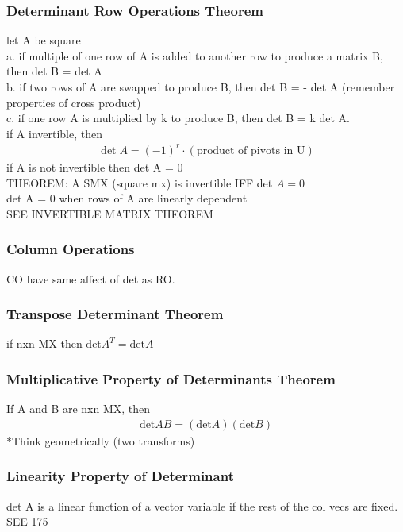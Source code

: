 \documentclass[12pt]{article}
\begin{document}
    \subsubsection{Determinant Row Operations Theorem}
        let A be square \\
        a. if multiple of one row of A is added to another row to
        produce a matrix B, then det B = det A \\
        b. if two rows of A are swapped to produce B, then
        det B = - det A (remember properties of cross product) \\
        c. if one row A is multiplied by k to produce B, then
        det B = k det A.\\
        if A invertible, then
        \begin{align*}
            \det A = (-1)^{r} \cdot (\text{product of pivots in U})
        \end{align*}
        if A is not invertible then det A = 0 \\
        THEOREM: A SMX (square mx) is invertible IFF det  $A= 0$  \\
        det A = 0 when rows of A are linearly dependent \\
        SEE INVERTIBLE MATRIX THEOREM 
    \subsubsection{Column Operations}
        CO have same affect of det as RO.
    \subsubsection{Transpose Determinant Theorem}
        if nxn MX then $\text{det} A^T = \text{det} A$ 
    \subsubsection{Multiplicative Property of Determinants Theorem}
        If A and B are nxn MX, then
        \begin{align*}
            \text{det} AB = (\text{det} A)(\text{det} B)
        \end{align*}
        *Think geometrically (two transforms)
    \subsubsection{Linearity Property of Determinant}
        det A is a linear function of a vector variable if the
        rest of the col vecs are fixed. \\
        SEE 175 
\end{document}
